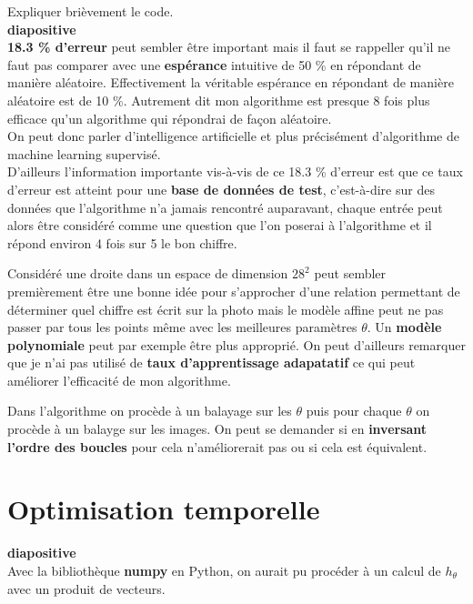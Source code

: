 \documentclass{article}
\begin{document}
		Expliquer brièvement le code.\\
	
		\textbf{diapositive}\\
		
		\textbf{18.3 \% d'erreur} peut sembler être important mais il faut se rappeller qu'il ne faut pas comparer avec une \textbf{espérance} intuitive de 50 \% en répondant de manière aléatoire. Effectivement la véritable espérance en répondant de manière aléatoire est de 10 \%. Autrement dit mon algorithme est presque 8 fois plus efficace qu'un algorithme qui répondrai de façon aléatoire.\\
		On peut donc parler d'intelligence artificielle et plus précisément d'algorithme de machine learning supervisé.\\
		D'ailleurs l'information importante vis-à-vis de ce 18.3 \% d'erreur est que ce taux d'erreur est atteint pour une \textbf{base de données de test}, c'est-à-dire sur des données que l'algorithme n'a jamais rencontré auparavant, chaque entrée peut alors être considéré comme une question que l'on poserai à l'algorithme et il répond environ 4 fois sur 5 le bon chiffre. %
	
		Considéré une droite dans un espace de dimension $28^2$ peut sembler premièrement être une bonne idée pour s'approcher d'une relation permettant de déterminer quel chiffre est écrit sur la photo mais le modèle affine peut ne pas passer par tous les points même avec les meilleures paramètres $\theta$. Un \textbf{modèle polynomiale} peut par exemple être plus approprié.
		On peut d'ailleurs remarquer que je n'ai pas utilisé de \textbf{taux d'apprentissage adapatatif} ce qui peut améliorer l'efficacité de mon algorithme.
	
	Dans l'algorithme on procède à un balayage sur les $\theta$ puis pour chaque $\theta$ on procède à un balayge sur les images. On peut se demander si en \textbf{inversant l'ordre des boucles} pour cela n'améliorerait pas ou si cela est équivalent.
	
  \section{Optimisation temporelle}
	
	\textbf{diapositive}\\
	
	Avec la bibliothèque \textbf{numpy} en Python, on aurait pu procéder à un calcul de $h_\theta$ avec un produit de vecteurs.\\
	
\end{document}
